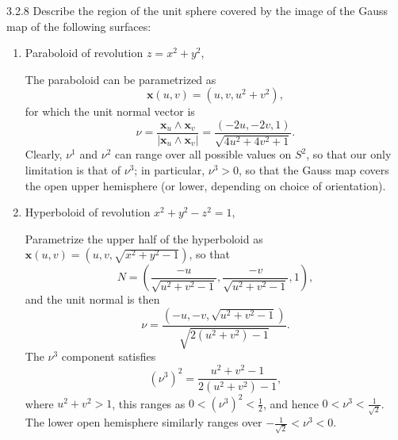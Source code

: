 \documentclass[11pt]{article}
\begin{document}
\begin{problem}{3.2.8}
  Describe the region of the unit sphere covered by the image of the Gauss map of the following surfaces:
  \begin{enumerate}[label=(\alph*)]
    \item Paraboloid of revolution \( z = x^2 + y^2 \),
          \begin{answer}
            The paraboloid can be parametrized as
            \begin{equation}
            \label{eq:12}
            \mathbf{x}(u,v) = (u, v, u^2 + v^2),
          \end{equation}
          for which the unit normal vector is
          \begin{equation}
          \label{eq:13}
          \nu = \frac{\mathbf{x}_u \wedge \mathbf{x}_v}{|\mathbf{x}_u \wedge \mathbf{x}_v |} = \frac{(-2u, -2v, 1)}{\sqrt{4 u^2 + 4 v^2 + 1}}.
        \end{equation}
        Clearly, \(\nu^1\) and \(\nu^2\) can range over all possible values on \( S^2 \), so that our only limitation is that of \( \nu^3 \); in particular, \(\nu^3 > 0\), so that the Gauss map covers the open upper hemisphere (or lower, depending on choice of orientation).
          \end{answer}
    \item Hyperboloid of revolution \( x^2 + y^2 - z^2 = 1 \),
          \begin{answer}
            Parametrize the upper half of the hyperboloid as \( \mathbf{x}(u,v) = (u, v, \sqrt{x^2 + y^2 - 1}) \),
            so that
            \begin{equation}
            \label{eq:14}
            N = \left(\frac{-u}{\sqrt{u^2 + v^2 -1}}, \frac{-v}{\sqrt{u^2 + v^2 - 1}}, 1\right),
          \end{equation}
          and the unit normal is then
          \begin{equation}
          \label{eq:15}
          \nu = \frac{(-u, -v, \sqrt{u^2 + v^2  - 1})}{\sqrt{2(u^2 + v^2) - 1}}.
        \end{equation}
        The \(\nu^3\) component satisfies
        \begin{equation}
        \label{eq:16}
        (\nu^3)^2 = \frac{u^2 + v^2 - 1}{2(u^2 + v^2) - 1},
      \end{equation}
      where \( u^2 + v^2 > 1 \), this ranges as \( 0 < (\nu^3)^2 < \frac{1}{2} \), and hence \( 0 < \nu^3 < \frac{1}{\sqrt{2}} \).
      The lower open hemisphere similarly ranges over \( - \frac{1}{\sqrt{2}} < \nu^3 < 0 \).

\end{answer}
\end{enumerate}
\end{problem}
\end{document}
